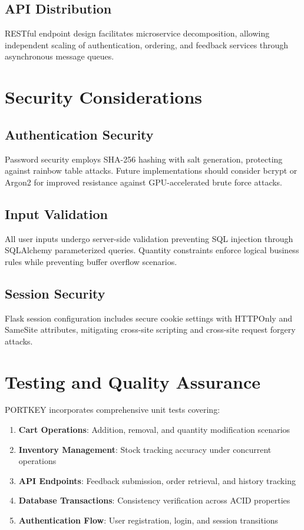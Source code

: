 \documentclass{ieeeaccess}
\begin{document}
\subsection{API Distribution}
RESTful endpoint design facilitates microservice decomposition, allowing independent scaling of authentication, ordering, and feedback services through asynchronous message queues.

\section{Security Considerations}
\label{sec:security}

\subsection{Authentication Security}
Password security employs SHA-256 hashing with salt generation, protecting against rainbow table attacks. Future implementations should consider bcrypt or Argon2 for improved resistance against GPU-accelerated brute force attacks.

\subsection{Input Validation}
All user inputs undergo server-side validation preventing SQL injection through SQLAlchemy parameterized queries. Quantity constraints enforce logical business rules while preventing buffer overflow scenarios.

\subsection{Session Security}
Flask session configuration includes secure cookie settings with HTTPOnly and SameSite attributes, mitigating cross-site scripting and cross-site request forgery attacks.

\section{Testing and Quality Assurance}
\label{sec:testing}

PORTKEY incorporates comprehensive unit tests covering:

\begin{enumerate}
\item \textbf{Cart Operations}: Addition, removal, and quantity modification scenarios
\item \textbf{Inventory Management}: Stock tracking accuracy under concurrent operations
\item \textbf{API Endpoints}: Feedback submission, order retrieval, and history tracking
\item \textbf{Database Transactions}: Consistency verification across ACID properties
\item \textbf{Authentication Flow}: User registration, login, and session transitions
\end{enumerate}
\end{document}
